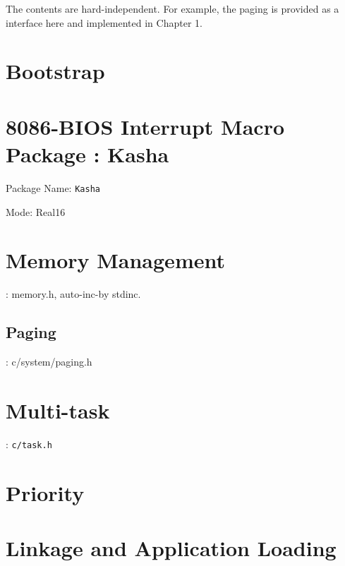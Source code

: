 
The contents are hard-independent. For example, the paging is provided as a interface here and implemented in Chapter 1.


\section{Bootstrap}


\section{8086-BIOS Interrupt Macro Package : Kasha}

Package Name: \verb|Kasha| %

Mode: Real16



\section{Memory Management}
: memory.h, auto-inc-by stdinc.

\subsection{Paging}

: c/system/paging.h

\section{Multi-task}
: \verb|c/task.h|

\section{Priority}






\section{Linkage and Application Loading}


